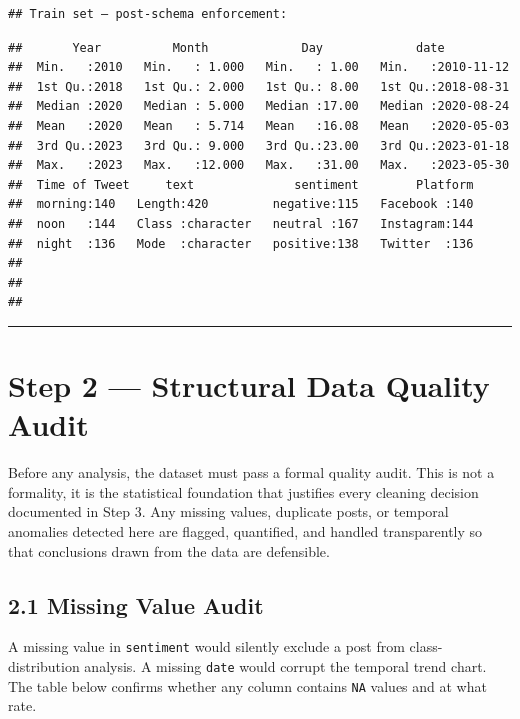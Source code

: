 \documentclass[
]{article}
\begin{document}
\begin{verbatim}
## Train set — post-schema enforcement:
\end{verbatim}

\begin{verbatim}
##       Year          Month             Day             date           
##  Min.   :2010   Min.   : 1.000   Min.   : 1.00   Min.   :2010-11-12  
##  1st Qu.:2018   1st Qu.: 2.000   1st Qu.: 8.00   1st Qu.:2018-08-31  
##  Median :2020   Median : 5.000   Median :17.00   Median :2020-08-24  
##  Mean   :2020   Mean   : 5.714   Mean   :16.08   Mean   :2020-05-03  
##  3rd Qu.:2023   3rd Qu.: 9.000   3rd Qu.:23.00   3rd Qu.:2023-01-18  
##  Max.   :2023   Max.   :12.000   Max.   :31.00   Max.   :2023-05-30  
##  Time of Tweet     text              sentiment        Platform  
##  morning:140   Length:420         negative:115   Facebook :140  
##  noon   :144   Class :character   neutral :167   Instagram:144  
##  night  :136   Mode  :character   positive:138   Twitter  :136  
##                                                                 
##                                                                 
## 
\end{verbatim}

\begin{center}\rule{0.5\linewidth}{0.5pt}\end{center}

\section{Step 2 --- Structural Data Quality
Audit}\label{step-2-structural-data-quality-audit}

Before any analysis, the dataset must pass a formal quality audit. This
is not a formality, it is the statistical foundation that justifies
every cleaning decision documented in Step 3. Any missing values,
duplicate posts, or temporal anomalies detected here are flagged,
quantified, and handled transparently so that conclusions drawn from the
data are defensible.

\subsection{2.1 Missing Value Audit}\label{missing-value-audit}

A missing value in \texttt{sentiment} would silently exclude a post from
class-distribution analysis. A missing \texttt{date} would corrupt the
temporal trend chart. The table below confirms whether any column
contains \texttt{NA} values and at what rate.
\end{document}
